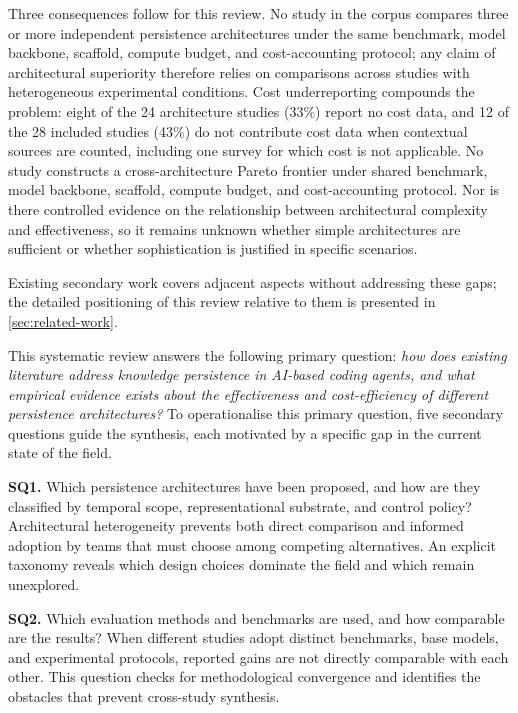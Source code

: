 Three consequences follow for this review.
No study in the corpus compares three or more independent persistence
architectures under the same benchmark, model backbone, scaffold,
compute budget, and cost-accounting protocol;
any claim of architectural superiority therefore relies on comparisons
across studies with heterogeneous experimental conditions.
Cost underreporting compounds the problem: eight of the 24
architecture studies (33\%) report no cost data, and 12 of the 28
included studies (43\%) do not contribute cost data when contextual
sources are counted, including one survey for which cost is not
applicable.
No study constructs a cross-architecture Pareto frontier under shared
benchmark, model backbone, scaffold, compute budget, and
cost-accounting protocol.
Nor is there controlled evidence on the relationship between
architectural complexity and effectiveness, so it remains unknown
whether simple architectures are sufficient or whether sophistication
is justified in specific scenarios.

Existing secondary work covers adjacent aspects without addressing
these gaps; the detailed positioning of this review relative to them is
presented in \autoref{sec:related-work}.

This systematic review answers the following primary question:
\textit{how does existing literature address knowledge persistence in
AI-based coding agents, and what empirical evidence exists about the
effectiveness and cost-efficiency of different persistence
architectures?}
To operationalise this primary question, five secondary questions guide
the synthesis, each motivated by a specific gap in the current state of
the field.

\noindent\textbf{SQ1.} Which persistence architectures have been
proposed, and how are they classified by temporal scope,
representational substrate, and control policy?
Architectural heterogeneity prevents both direct comparison and
informed adoption by teams that must choose among competing
alternatives.
An explicit taxonomy reveals which design choices dominate the field
and which remain unexplored.

\noindent\textbf{SQ2.} Which evaluation methods and benchmarks are
used, and how comparable are the results?
When different studies adopt distinct benchmarks, base models, and
experimental protocols, reported gains are not directly comparable with
each other.
This question checks for methodological convergence and identifies the
obstacles that prevent cross-study synthesis.

